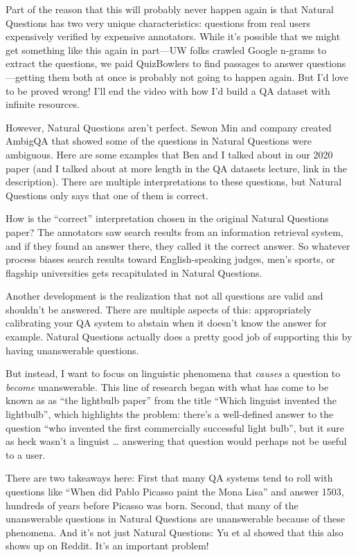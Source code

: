 Part of the reason that this will probably never happen again is that Natural Questions has two very unique characteristics: questions from real users expensively verified by expensive annotators.  While it’s possible that we might get something like this again in part—UW folks crawled Google n-grams to extract the questions, we paid QuizBowlers to find passages to answer questions—getting them both at once is probably not going to happen again.  But I’d love to be proved wrong!  I’ll end the video with how I’d build a QA dataset with infinite resources.

However, Natural Questions aren’t perfect.  Sewon Min and company created AmbigQA that showed some of the questions in Natural Questions were ambiguous.  Here are some examples that Ben and I talked about in our 2020 paper (and I talked about at more length in the QA datasets lecture, link in the description).  There are multiple interpretations to these questions, but Natural Questions only says that one of them is correct.  

How is the “correct” interpretation chosen in the original Natural Questions paper?  The annotators saw search results from an information retrieval system, and if they found an answer there, they called it the correct answer.  So whatever process biases search results toward English-speaking judges, men’s sports, or flagship universities gets recapitulated in Natural Questions.

Another development is the realization that not all questions are valid and shouldn’t be answered.  There are multiple aspects of this: appropriately calibrating your QA system to abstain when it doesn’t know the answer for example.  Natural Questions actually does a pretty good job of supporting this by having unanswerable questions.

But instead, I want to focus on linguistic phenomena that \emph{causes} a question to \emph{become} unanswerable.  This line of research began with what has come to be known as as “the lightbulb paper” from the title “Which linguist invented the lightbulb”, which highlights the problem: there’s a well-defined answer to the question “who invented the first commercially successful light bulb”, but it sure as heck wasn’t a linguist … answering that question would perhaps not be useful to a user.

There are two takeaways here: First that many QA systems tend to roll with questions like “When did Pablo Picasso paint the Mona Lisa” and answer 1503, hundreds of years before Picasso was born.  Second, that many of the unanswerable questions in Natural Questions are unanswerable because of these phenomena.  And it’s not just Natural Questions: Yu et al showed that this also shows up on Reddit.  It’s an important problem!

